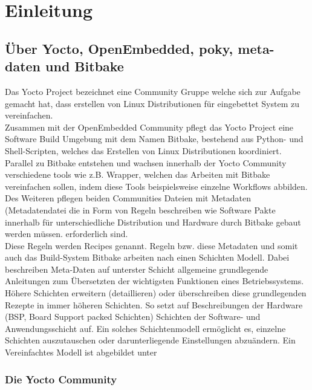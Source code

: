 \chapter{Einleitung} \label{chp:einleitung}


\section{Über Yocto, OpenEmbedded, poky, meta-daten und Bitbake}

Das Yocto Project bezeichnet eine Community Gruppe welche sich zur Aufgabe
gemacht hat, dass erstellen von Linux Distributionen für eingebettet System
zu vereinfachen.  \\

Zusammen mit der OpenEmbedded Community pflegt das \gls{Yocto Project} eine
Software Build Umgebung mit dem Namen \gls{Bitbake}, bestehend aus Python- und
Shell-Scripten, welches das Erstellen von Linux Distributionen koordiniert.
Parallel zu Bitbake  entstehen und wachsen innerhalb der Yocto Community
verschiedene tools wie z.B. Wrapper, welchen das Arbeiten mit Bitbake
vereinfachen sollen, indem diese Tools beispielsweise einzelne \glspl{Workflow}
abbilden.\\

Des Weiteren pflegen beiden Communities Dateien mit \gls{Metadaten}
(\gls{Metadatendatei} die in Form von Regeln  beschreiben wie Software Pakte
innerhalb für unterschiedliche Distribution und Hardware durch Bitbake gebaut
werden müssen.  erforderlich sind.  \\

Diese Regeln  werden \gls{Recipes} genannt. Regeln bzw. diese Metadaten und
somit auch das Build-System Bitbake arbeiten nach einen Schichten Modell.
Dabei beschreiben Meta-Daten auf unterster Schicht allgemeine grundlegende
Anleitungen zum Übersetzten der wichtigsten Funktionen eines Betriebssystems.
Höhere Schichten erweitern (detaillieren) oder überschreiben diese grundlegenden
Rezepte in immer höheren Schichten. So setzt auf Beschreibungen der Hardware
(BSP, Board Support packed Schichten) Schichten der Software- und
Anwendungsschicht auf. Ein solches Schichtenmodell ermöglicht es, einzelne
Schichten auszutauschen oder darunterliegende Einstellungen abzuändern.
Ein Vereinfachtes Modell ist abgebildet unter
\cite[S.26]{Gonzalez2018:Embedded_Linux_Development_Using_Yocto_Project_Cookbook_2nd}
\\
\subsection{Die Yocto Community}%
\label{sub:die_yocto_community}


